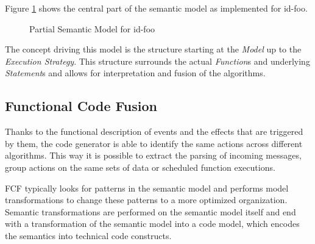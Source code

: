 \documentclass[conference]{IEEEtran}
\newcommand{\NAME}{id-foo\xspace}
\begin{document}
Figure \ref{fig:meta-model} shows the central part of the semantic model as
implemented for \NAME.

\begin{figure}[ht]
  \centering
\caption{Partial Semantic Model for \NAME}
\label{fig:meta-model}
\end{figure}

The concept driving this model is the structure starting at the \emph{Model} up
to the \emph{Execution Strategy}. This structure surrounds the actual
\emph{Function}s and underlying \emph{Statement}s and allows for interpretation
and fusion of the algorithms.

\subsection*{Functional Code Fusion}

Thanks to the functional description of events and the effects that are
triggered by them, the code generator is able to identify the same actions
across different algorithms. This way it is possible to extract the parsing of
incoming messages, group actions on the same sets of data or scheduled function
executions.

FCF typically looks for patterns in the semantic model and performs model
transformations to change these patterns to a more optimized organization.
Semantic transformations are performed on the semantic model itself and end
with a transformation of the semantic model into a code model, which encodes
the semantics into technical code constructs.
\end{document}
